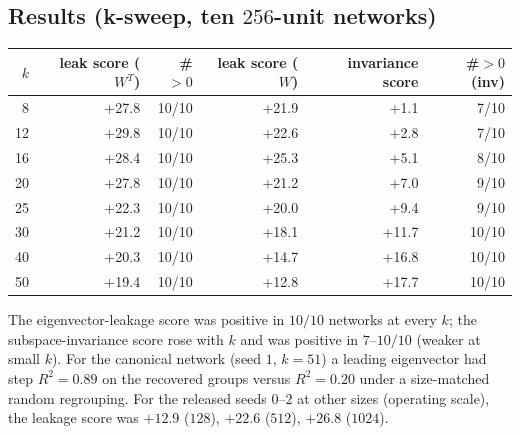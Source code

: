 \documentclass[11pt]{article}
\begin{document}
\subsection{Results (k-sweep, ten $256$-unit networks)}
\begin{center}\small
\begin{tabular}{rrrrrr}
\toprule
$k$ & leak score ($W^{T}$) & \#$>0$ & leak score ($W$) & invariance score & \#$>0$ (inv) \\
\midrule
8  & +27.8 & 10/10 & +21.9 & +1.1  & 7/10 \\
12 & +29.8 & 10/10 & +22.6 & +2.8  & 7/10 \\
16 & +28.4 & 10/10 & +25.3 & +5.1  & 8/10 \\
20 & +27.8 & 10/10 & +21.2 & +7.0  & 9/10 \\
25 & +22.3 & 10/10 & +20.0 & +9.4  & 9/10 \\
30 & +21.2 & 10/10 & +18.1 & +11.7 & 10/10 \\
40 & +20.3 & 10/10 & +14.7 & +16.8 & 10/10 \\
50 & +19.4 & 10/10 & +12.8 & +17.7 & 10/10 \\
\bottomrule
\end{tabular}
\end{center}
The eigenvector-leakage score was positive in $10/10$ networks at every $k$; the
subspace-invariance score rose with $k$ and was positive in $7$--$10/10$ (weaker at small $k$).
For the canonical network (seed $1$, $k=51$) a leading eigenvector had step $R^{2}=0.89$ on the
recovered groups versus $R^{2}=0.20$ under a size-matched random regrouping. For the released
seeds $0$--$2$ at other sizes (operating scale), the leakage score was $+12.9$ ($128$), $+22.6$
($512$), $+26.8$ ($1024$).
\end{document}
